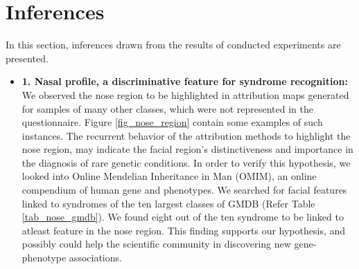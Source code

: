 \documentclass[../report.tex]{subfiles}
\begin{document}
    \section{Inferences}\label{sec_inf}
    In this section, inferences drawn from the results of conducted experiments are presented.  
    \begin{itemize}
    	\item \textbf{1. Nasal profile,  a discriminative feature for syndrome recognition:} We observed the nose region to be highlighted in attribution maps generated for samples of many other classes, which were not represented in the questionnaire. Figure \ref{fig_nose_region} contain some examples of such instances.  The recurrent behavior of the attribution methods to highlight the nose region, may indicate the facial region's distinctiveness and importance in the diagnosis of rare genetic conditions. In order to verify this hypothesis, we looked into Online Mendelian Inheritance in Man (OMIM), an online compendium of human gene and phenotypes. We searched for facial features linked to syndromes of the ten largest classes of GMDB (Refer Table \ref{tab_nose_gmdb}). We found eight out of the ten syndrome to be linked to atleast feature in the nose region. This finding supports our hypothesis, and possibly could help the scientific community in discovering new gene-phenotype associations. 
    	

\end{itemize}
\end{document}
